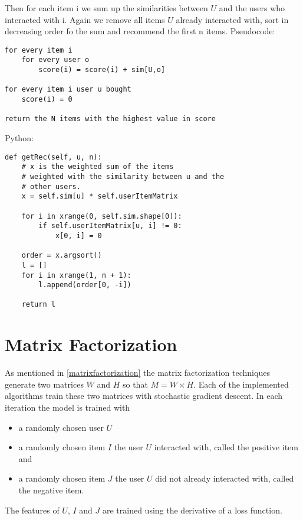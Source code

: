 Then for each item i we sum up the similarities between $U$ and the
users who interacted with i. Again we remove all items $U$ already interacted
with, sort in decreasing order fo the sum and recommend the first
n items.
Pseudocode:
\begin{lstlisting}[style=pseudocode]
for every item i 
    for every user o
        score(i) = score(i) + sim[U,o]

for every item i user u bought
    score(i) = 0

return the N items with the highest value in score
\end{lstlisting}
Python:
\begin{lstlisting}[style=python]
def getRec(self, u, n):
    # x is the weighted sum of the items
    # weighted with the similarity between u and the
    # other users.
    x = self.sim[u] * self.userItemMatrix

    for i in xrange(0, self.sim.shape[0]):
        if self.userItemMatrix[u, i] != 0:
            x[0, i] = 0

    order = x.argsort()
    l = []
    for i in xrange(1, n + 1):
        l.append(order[0, -i])

    return l
\end{lstlisting}

\section{Matrix Factorization}
As mentioned in \ref{matrixfactorization} the matrix factorization
techniques generate two matrices \(W\) and \(H\) so that \(M = W \times H\).
Each of the implemented algorithms train these two matrices with stochastic
gradient descent. In each iteration the model is trained with
\begin{itemize} 
    \item a randomly chosen user $U$
    \item a randomly chosen item $I$ the user $U$ interacted with, called the positive item and 
    \item a randomly chosen item $J$ the user $U$ did not already interacted with, 
        called the negative item.
\end{itemize}
The features of $U$, $I$ and $J$ are trained using the derivative
of a loss function.

